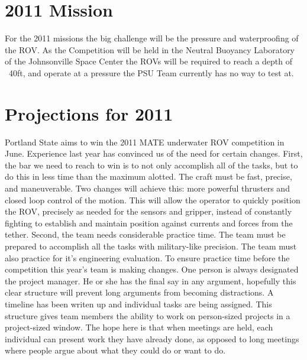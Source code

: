 \documentclass{article}
\begin{document}
\section{2011 Mission}
For the 2011 missions the big challenge will be the pressure and waterproofing of the ROV.  As the Competition will be held in the Neutral Buoyancy Laboratory of the Johnsonville Space Center
the ROVs will be required to reach a depth of ~40ft, and operate at a pressure the PSU Team currently has no way to test at.


\section{Projections for 2011}

Portland State aims to win the 2011 MATE underwater ROV competition in June. Experience last year has convinced us of the need for certain changes. First, the bar we need to reach to win is to not only accomplish all of the tasks, but to do this in less time than the maximum alotted. The craft must be fast, precise, and maneuverable.  Two changes will achieve this: more powerful thrusters and closed loop control of the motion. This will allow the operator to quickly position the ROV, precisely as needed for the sensors and gripper, instead of constantly fighting to establish and maintain position against currents and forces from the tether. Second, the team needs considerable practice time. The team must be prepared to accomplish all the tasks with military-like precision. The team must also practice for it's engineering evaluation. To ensure practice time before the competition this year's team is making changes. One person is always designated the project manager. He or she has the final say in any argument, hopefully this clear structure will prevent long arguments from becoming distractions. A timeline has been writen up and individual tasks are being assigned. This structure gives team members the ability to work on person-sized projects in a project-sized window. The hope here is that when meetings are held, each individual can present work they have already done, as opposed to long meetings where people argue about what they could do or want to do.
\end{document}
